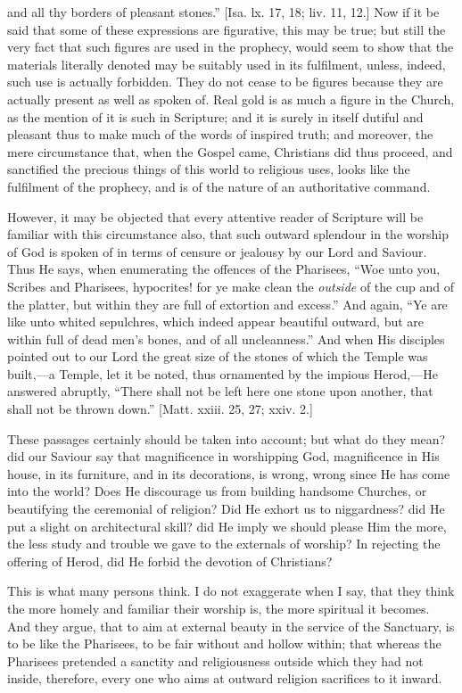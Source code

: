 and all thy borders of pleasant stones.'' [Isa. lx. 17, 18; liv.
11, 12.] Now if it be said that some of these expressions are
figurative, this may be true; but still the very fact that such
figures are used in the prophecy, would seem to show that the
materials literally denoted may be suitably used in its fulfilment,
unless, indeed, such use is actually forbidden. They do not cease to
be figures because they are actually present as well as spoken of.
Real gold is as much a figure in the Church, as the mention of it is
such in Scripture; and it is surely in itself dutiful and pleasant
thus to make much of the words of inspired truth; and moreover, the
mere circumstance that, when the Gospel came, Christians did thus
proceed, and sanctified the precious things of this world to religious
uses, looks like the fulfilment of the prophecy, and is of the nature
of an authoritative command.

However, it may be objected that every attentive reader of
Scripture will be familiar with this circumstance also, that such
outward splendour in the worship of God is spoken of in terms of
censure or jealousy by our Lord and Saviour. Thus He says, when
enumerating the offences of the Pharisees, ``Woe unto you, Scribes
and Pharisees, hypocrites! for ye make clean the \emph{outside} of the
cup and of the platter, but within they are full of extortion and
excess.'' And again, ``Ye are like unto whited sepulchres,
which indeed appear beautiful outward, but are within full of dead
men's bones, and of all uncleanness.'' And when His disciples
pointed out to our Lord the great size of the stones of which the
Temple was built,—a Temple, let it be noted, thus ornamented by the
impious Herod,—He answered abruptly, ``There shall not be left
here one stone upon another, that shall not be thrown down.''
[Matt. xxiii. 25, 27; xxiv. 2.]

These passages certainly should be taken into account; but what do
they mean? did our Saviour say that magnificence in worshipping God,
magnificence in His house, in its furniture, and in its decorations,
is wrong, wrong since He has come into the world? Does He discourage
us from building handsome Churches, or beautifying the ceremonial of
religion? Did He exhort us to niggardness? did He put a slight on
architectural skill? did He imply we should please Him the more, the
less study and trouble we gave to the externals of worship? In
rejecting the offering of Herod, did He forbid the devotion of
Christians?

This is what many persons think. I do not exaggerate when I say,
that they think the more homely and familiar their worship is, the
more spiritual it becomes. And they argue, that to aim at external
beauty in the service of the Sanctuary, is to be like the Pharisees,
to be fair without and hollow within; that whereas the Pharisees
pretended a sanctity and religiousness outside which they had not
inside, therefore, every one who aims at outward religion sacrifices
to it inward.

